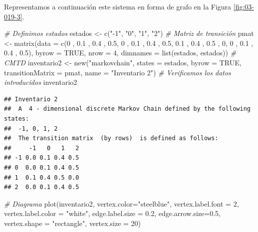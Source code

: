 \documentclass[
]{book}
\newenvironment{Shaded}{\begin{snugshade}}{\end{snugshade}}
\newcommand{\AttributeTok}[1]{\textcolor[rgb]{0.77,0.63,0.00}{#1}}
\newcommand{\CommentTok}[1]{\textcolor[rgb]{0.56,0.35,0.01}{\textit{#1}}}
\newcommand{\ConstantTok}[1]{\textcolor[rgb]{0.00,0.00,0.00}{#1}}
\newcommand{\DecValTok}[1]{\textcolor[rgb]{0.00,0.00,0.81}{#1}}
\newcommand{\FloatTok}[1]{\textcolor[rgb]{0.00,0.00,0.81}{#1}}
\newcommand{\FunctionTok}[1]{\textcolor[rgb]{0.00,0.00,0.00}{#1}}
\newcommand{\NormalTok}[1]{#1}
\newcommand{\OtherTok}[1]{\textcolor[rgb]{0.56,0.35,0.01}{#1}}
\newcommand{\StringTok}[1]{\textcolor[rgb]{0.31,0.60,0.02}{#1}}
\theoremstyle{definition}
\theoremstyle{definition}
\theoremstyle{definition}
\theoremstyle{definition}
\theoremstyle{remark}
\begin{document}
Representamos a continuación este sistema en forma de grafo en la Figura \ref{fig:03-019-3}.

\begin{Shaded}
\begin{Highlighting}[]
\CommentTok{\# Definimos estados}
\NormalTok{estados }\OtherTok{\textless{}{-}} \FunctionTok{c}\NormalTok{(}\StringTok{"{-}1"}\NormalTok{, }\StringTok{"0"}\NormalTok{, }\StringTok{"1"}\NormalTok{, }\StringTok{"2"}\NormalTok{)}
\CommentTok{\# Matriz de transición }
\NormalTok{pmat }\OtherTok{\textless{}{-}} \FunctionTok{matrix}\NormalTok{(}\AttributeTok{data =} \FunctionTok{c}\NormalTok{(}\DecValTok{0}\NormalTok{ , }\FloatTok{0.1}\NormalTok{ , }\FloatTok{0.4}\NormalTok{ , }\FloatTok{0.5}\NormalTok{,}
                        \DecValTok{0}\NormalTok{ , }\FloatTok{0.1}\NormalTok{ , }\FloatTok{0.4}\NormalTok{ , }\FloatTok{0.5}\NormalTok{,}
                        \FloatTok{0.1}\NormalTok{ , }\FloatTok{0.4}\NormalTok{ , }\FloatTok{0.5}\NormalTok{ , }\DecValTok{0}\NormalTok{,}
                        \DecValTok{0}\NormalTok{ , }\FloatTok{0.1}\NormalTok{ , }\FloatTok{0.4}\NormalTok{ , }\FloatTok{0.5}\NormalTok{), }
               \AttributeTok{byrow =} \ConstantTok{TRUE}\NormalTok{, }\AttributeTok{nrow =} \DecValTok{4}\NormalTok{, }
               \AttributeTok{dimnames =} \FunctionTok{list}\NormalTok{(estados, estados))}
\CommentTok{\# CMTD}
\NormalTok{inventario2 }\OtherTok{\textless{}{-}} \FunctionTok{new}\NormalTok{(}\StringTok{"markovchain"}\NormalTok{, }\AttributeTok{states =}\NormalTok{ estados, }
                 \AttributeTok{byrow =} \ConstantTok{TRUE}\NormalTok{, }\AttributeTok{transitionMatrix =}\NormalTok{ pmat, }
                 \AttributeTok{name =} \StringTok{"Inventario 2"}\NormalTok{)}
\CommentTok{\# Verificamos los datos introducidos}
\NormalTok{inventario2}
\end{Highlighting}
\end{Shaded}

\begin{verbatim}
## Inventario 2 
##  A  4 - dimensional discrete Markov Chain defined by the following states: 
##  -1, 0, 1, 2 
##  The transition matrix  (by rows)  is defined as follows: 
##     -1   0   1   2
## -1 0.0 0.1 0.4 0.5
## 0  0.0 0.1 0.4 0.5
## 1  0.1 0.4 0.5 0.0
## 2  0.0 0.1 0.4 0.5
\end{verbatim}

\begin{Shaded}
\begin{Highlighting}[]
\CommentTok{\# Diagrama}
\FunctionTok{plot}\NormalTok{(inventario2, }\AttributeTok{vertex.color=}\StringTok{"steelblue"}\NormalTok{, }
     \AttributeTok{vertex.label.font =} \DecValTok{2}\NormalTok{, }
     \AttributeTok{vertex.label.color =} \StringTok{"white"}\NormalTok{,}
     \AttributeTok{edge.label.size =} \FloatTok{0.2}\NormalTok{,}
     \AttributeTok{edge.arrow.size=}\FloatTok{0.5}\NormalTok{, }
     \AttributeTok{vertex.shape =} \StringTok{"rectangle"}\NormalTok{,}
     \AttributeTok{vertex.size =} \DecValTok{20}\NormalTok{)}
\end{Highlighting}
\end{Shaded}
\end{document}
